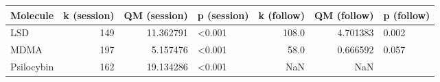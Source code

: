 \begin{tabular}{lrrlrrl}
\toprule
  Molecule &  k (session) &  QM (session) & p (session) &  k (follow) &  QM (follow) & p (follow) \\
\midrule
       LSD &          149 &     11.362791 &      <0.001 &       108.0 &     4.701383 &      0.002 \\
      MDMA &          197 &      5.157476 &      <0.001 &        58.0 &     0.666592 &      0.057 \\
Psilocybin &          162 &     19.134286 &      <0.001 &         NaN &          NaN &            \\
\bottomrule
\end{tabular}
